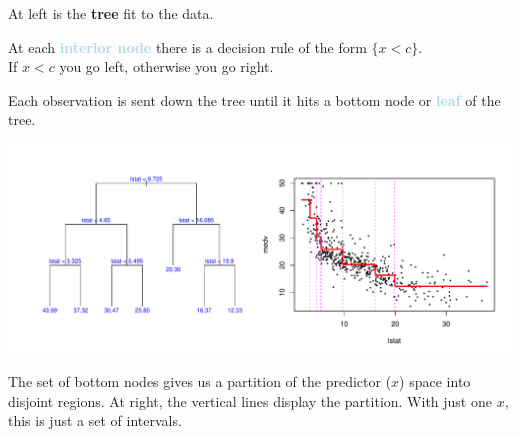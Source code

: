 \documentclass{beamer}
\newcommand{\bo}[1]{\textcolor{burntorange}{#1}}
\newcommand{\lb}[1]{\textcolor{lightblue}{#1}}
\newcommand{\sko}{\vspace{.1in}}
\begin{document}
\begin{frame}

At left is the \bo{\bf tree} fit to the data.\sko

At each \lb{\bf interior  node} there is a decision rule of the form $\{x<c\}$.\\
If $x<c$ you go left, otherwise you go right.\sko

Each observation is sent down the tree until it hits a bottom node or \lb{\bf leaf} of
the tree.\sko

\vspace{-.63in}

\begin{center}
\hspace*{-.5in} \includegraphics[scale=.4]{boston-lstat-simple-tree.pdf}
\end{center}

\vspace{-.35in}

The set of bottom nodes gives us a partition of the predictor ($x$) space into disjoint regions.
At right, the vertical lines display the partition.  With just one $x$, this is just
a set of intervals.  

\end{frame}
\end{document}
